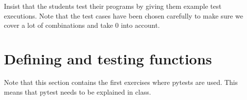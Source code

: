 \documentclass[
  fontsize=10pt,
  a4paper,
]{scrartcl}
\newenvironment{howTILEd}%
  {\begin{mdframed}[skipabove=10pt,skipbelow=10pt,backgroundcolor=pink!40]}%
  {\end{mdframed}}
\begin{document}
\begin{enumerate}
\begin{howTILEd}
Insist that the students test their programs by giving them example test executions. Note that the test cases have been chosen carefully to make sure we cover a lot of combinations and take 0 into account.
\end{howTILEd}

\end{enumerate}


\section{Defining and testing functions}

Note that this section contains the first exercises where pytests are used. This means that pytest needs to be explained in class.
\end{document}
